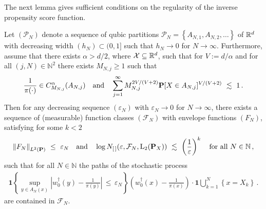 The next lemma gives sufficient conditions on the regularity of the inverse propensity score function.
\begin{lemma}
  \label{lem:br_n_st}
  Let $(\mathcal{P}_N)$ denote a sequence of qubic partitions
  $\mathcal{P}_N=\left\{ A_{N,1},A_{N,2},\ldots \right\}$ 
  of $\mathbb{R}^d$ 
  with decreasing width $(h_N)\subset(0,1]$ such that $h_N\to 0$ for $N\to\infty$.
  Furthermore, assume that there exists
  $\alpha>d/2$, where $\mathcal{X}\subseteq \mathbb{R}^d$, such
  that for 
  $V:=d/\alpha$
 and for all 
$
(j,N)\in\mathbb{N}^2
$
there exists 
$M_{N,j}\ge 1$ such that 
\begin{gather}
  \label{0897}
  \frac{1}{\pi(\cdot)}
  \in C^\alpha_{M_{N,j}}(A_{N,j})
  \quad
  \text{and}
  \quad
  \sum_{j=1}^{\infty} 
  M_{N,j}^{2V/(V+2)}
  \P
  [
  X\in A_{N,j}
  ]^{V/(V+2)}
  \ 
  \lesssim
  \ 
  1
  \,.
\end{gather}
Then for any decreasing sequence
  $(\varepsilon_N)$ with $\varepsilon_N\to 0$ for $N\to\infty$,
there exists a sequence of (measurable) function classes
$(\mathcal{F}_N)$
with envelope functions
$(F_N)$,
satisfying 
for some $k<2$
\begin{gather*}
\norm{F_N}_{L^2(\P)}
\ 
\le
\ 
\varepsilon_N
\quad
\text{and}
\quad
  \log
  N_{[\,]}(\varepsilon,\mathcal{F}_N,\mathrm{L}_2(\P_{X}))
  \ 
  \lesssim
  \ 
  \left( 
  \frac{1}{\varepsilon}
  \right)^k
  \quad
  \text{for all}
  \ 
  N\in\mathbb{N}
  \,,
\end{gather*}
such that
for all $N\in\mathbb{N}$ the paths of the stochastic process
\begin{gather}
  \label{error_process}
  \mathbf{1}{
    \left\{ 
      \sup_{y\in A_N(x)}
      \left| 
      w_0^\dagger(y)
      -
      \frac{1}{\pi(y)}
      \right|
      \,
      \le
      \,
      \varepsilon_N
    \right\}
  }
  \left( 
    w_0^\dagger(x)
      -
      \frac{1}{\pi(x)}
  \right)
  \cdot
  \mathbf{1}
  \bigcup_{k=1}^N
  \left\{ x=X_k \right\}
  \,.
\end{gather}
are contained in $\mathcal{F}_N$.
\end{lemma}
